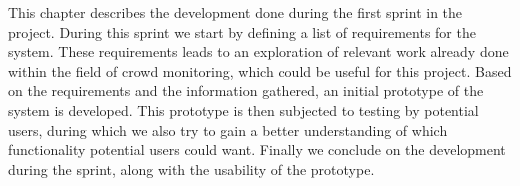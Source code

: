 This chapter describes the development done during the first sprint in the project. During this sprint we start by defining a list of requirements for the system. These requirements leads to an exploration of relevant work already done within the field of crowd monitoring, which could be useful for this project. Based on the requirements and the information gathered, an initial prototype of the system is developed. This prototype is then subjected to testing by potential users, during which we also try to gain a better understanding of which functionality potential users could want. Finally we conclude on the development during the sprint, along with the usability of the prototype.


